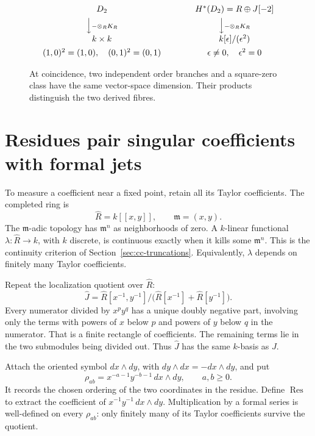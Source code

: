 \begin{figure}[htbp]
\centering
\[
\begin{array}{c@{\qquad\qquad}c}
 D_2 & H^*(D_2)=R\oplus J[-2]\\[4pt]
 \Big\downarrow\scriptstyle{-\otimes_RK_R}
 &\Big\downarrow\scriptstyle{-\otimes_RK_R}\\[4pt]
 k\times k & k[\epsilon]/(\epsilon^2)\\[4pt]
 (1,0)^2=(1,0),\quad(0,1)^2=(0,1)
 & \epsilon\ne0,\quad\epsilon^2=0
\end{array}
\]
\caption{At coincidence, two independent order branches and a square-zero
class have the same vector-space dimension. Their products distinguish
the two derived fibres.}
\end{figure}

\section{Residues pair singular coefficients with formal jets}

To measure a coefficient near a fixed point, retain all its Taylor
coefficients. The completed ring is
\[
 \widehat R=k[[x,y]],\qquad \mathfrak m=(x,y).
\]
The $\mathfrak m$-adic topology has $\mathfrak m^n$ as neighborhoods
of zero. A $k$-linear functional $\lambda:\widehat R\to k$, with
$k$ discrete, is continuous exactly when it kills some $\mathfrak m^n$.
This is the continuity criterion of Section~\ref{sec:cc-truncations}.
Equivalently, $\lambda$ depends on finitely many Taylor coefficients.

Repeat the localization quotient over $\widehat R$:
\[
 \widehat J=
 \widehat R[x^{-1},y^{-1}]/
 \bigl(\widehat R[x^{-1}]+\widehat R[y^{-1}]\bigr).
\]
Every numerator divided by $x^py^q$ has a unique doubly negative
part, involving only the terms with powers of $x$ below $p$ and
powers of $y$ below $q$ in the numerator.
That is a finite rectangle of coefficients.
The remaining terms lie in the two submodules being divided out.
Thus $\widehat J$ has the same $k$-basis as $J$.

Attach the oriented symbol $dx\wedge dy$, with
$dy\wedge dx=-dx\wedge dy$, and put
\[
 \rho_{ab}=x^{-a-1}y^{-b-1}\,dx\wedge dy,
 \qquad a,b\ge0.
\]
It records the chosen ordering of the two coordinates in the residue.
Define $\operatorname{Res}$ to extract the coefficient of
$x^{-1}y^{-1}\,dx\wedge dy$.
Multiplication by a formal series is well-defined on every $\rho_{ab}$:
only finitely many of its Taylor coefficients survive the quotient.

